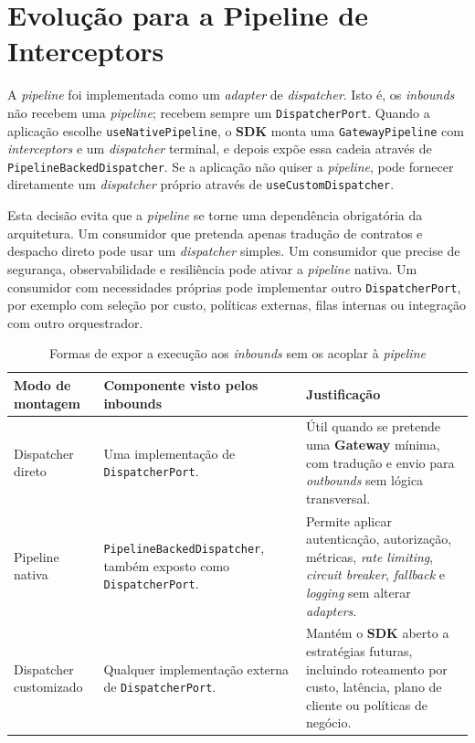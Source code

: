     \section{Evolução para a Pipeline de Interceptors}
    A \textit{pipeline} foi implementada como um \textit{adapter} de \textit{dispatcher}. Isto é, os \textit{inbounds} não recebem uma \textit{pipeline}; recebem sempre um \texttt{DispatcherPort}. Quando a aplicação escolhe \texttt{use\allowbreak Native\allowbreak Pipeline}, o \textbf{SDK} monta uma \texttt{GatewayPipeline} com \textit{interceptors} e um \textit{dispatcher} terminal, e depois expõe essa cadeia através de \texttt{PipelineBackedDispatcher}. Se a aplicação não quiser a \textit{pipeline}, pode fornecer diretamente um \textit{dispatcher} próprio através de \texttt{useCustomDispatcher}.

    Esta decisão evita que a \textit{pipeline} se torne uma dependência obrigatória da arquitetura. Um consumidor que pretenda apenas tradução de contratos e despacho direto pode usar um \textit{dispatcher} simples. Um consumidor que precise de segurança, observabilidade e resiliência pode ativar a \textit{pipeline} nativa. Um consumidor com necessidades próprias pode implementar outro \texttt{DispatcherPort}, por exemplo com seleção por custo, políticas externas, filas internas ou integração com outro orquestrador.

    \begin{table}[H]
        \centering
        \footnotesize
        \renewcommand{\arraystretch}{1.25}
        \begin{tabularx}{\textwidth}{|>{\raggedright\arraybackslash}p{3.3cm}|Y|Y|}
            \hline
            \textbf{Modo de montagem} & \textbf{Componente visto pelos inbounds} & \textbf{Justificação} \\
            \hline
            Dispatcher direto & Uma implementação de \texttt{DispatcherPort}. & Útil quando se pretende uma \textbf{Gateway} mínima, com tradução e envio para \textit{outbounds} sem lógica transversal. \\
            \hline
            Pipeline nativa & \texttt{PipelineBackedDispatcher}, também exposto como \texttt{DispatcherPort}. & Permite aplicar autenticação, autorização, métricas, \textit{rate limiting}, \textit{circuit breaker}, \textit{fallback} e \textit{logging} sem alterar \textit{adapters}. \\
            \hline
            Dispatcher customizado & Qualquer implementação externa de \texttt{DispatcherPort}. & Mantém o \textbf{SDK} aberto a estratégias futuras, incluindo roteamento por custo, latência, plano de cliente ou políticas de negócio. \\
            \hline
        \end{tabularx}
        \caption{Formas de expor a execução aos \textit{inbounds} sem os acoplar à \textit{pipeline}}
        \label{tab:dispatcher-pipeline-modes}
    \end{table}

